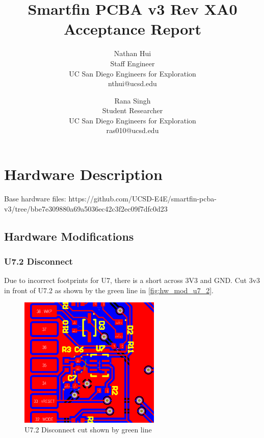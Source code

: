 \documentclass{article}
\title{Smartfin PCBA v3 Rev XA0 Acceptance Report}
\author{Nathan Hui\\Staff Engineer\\UC San Diego Engineers for Exploration\\nthui@ucsd.edu
\and
Rana Singh\\Student Researcher\\UC San Diego Engineers for Exploration\\ras010@ucsd.edu}
\begin{document}
\maketitle
\section{Hardware Description}
Base hardware files: https://github.com/UCSD-E4E/smartfin-pcba-v3/tree/bbe7e309880a69a5036ec42c3f2ec09f7dfc0d23

\subsection{Hardware Modifications}
\subsubsection{U7.2 Disconnect}
Due to incorrect footprints for U7, there is a short across 3V3 and GND.  Cut 3v3 in front of U7.2 as shown by the green line in \autoref{fig:hw_mod_u7_2}.
\begin{figure}[ht]
    \centering
    \includegraphics[width=0.6\textwidth]{U1_2 Disconnect.png}
    \caption{U7.2 Disconnect cut shown by green line}
    \label{fig:hw_mod_u7_2}
\end{figure}
\end{document}
